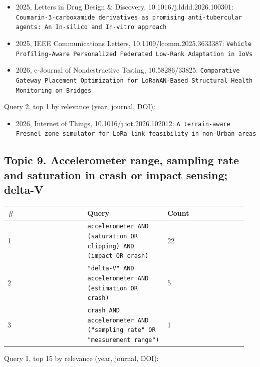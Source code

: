 \begin{itemize}
\item 2025, Letters in Drug Design \& Discovery, 10.1016/j.lddd.2026.100301: \texttt{Coumarin-3-carboxamide derivatives as promising anti-tubercular agents: An In-silico and In-vitro approach}
\item 2025, IEEE Communications Letters, 10.1109/lcomm.2025.3633387: \texttt{Vehicle Profiling-Aware Personalized Federated Low-Rank Adaptation in IoVs}
\item 2026, e-Journal of Nondestructive Testing, 10.58286/33825: \texttt{Comparative Gateway Placement Optimization for LoRaWAN-Based Structural Health Monitoring on Bridges}
\end{itemize}

Query 2, top 1 by relevance (year, journal, DOI):

\begin{itemize}
\item 2026, Internet of Things, 10.1016/j.iot.2026.102012: \texttt{A terrain-aware Fresnel zone simulator for LoRa link feasibility in non-Urban areas}
\end{itemize}

\subsection*{Topic 9. Accelerometer range, sampling rate and saturation in crash or impact sensing; delta-V}

{\scriptsize\raggedright
\begin{longtable}{p{0.317\linewidth}p{0.317\linewidth}p{0.317\linewidth}}
\toprule
\# & Query & Count \\
\midrule
\endhead
1 & \texttt{accelerometer AND (saturation OR clipping) AND (impact OR crash)} & 22 \\
2 & \texttt{"delta-V" AND accelerometer AND (estimation OR crash)} & 5 \\
3 & \texttt{crash AND accelerometer AND ("sampling rate" OR "measurement range")} & 1 \\
\bottomrule
\end{longtable}}

Query 1, top 15 by relevance (year, journal, DOI):

